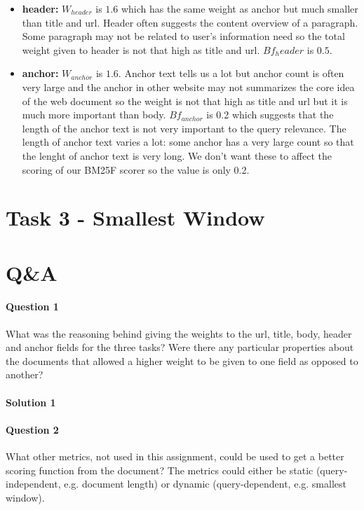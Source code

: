 \documentclass{article}
\begin{document}
\begin{itemize}
  \item \textbf{header:} $W_{header}$ is $1.6$ which has the same weight as anchor but much smaller than title and url. Header often suggests the content overview of a paragraph. Some paragraph may not be related to user's information need so the total weight given to header is not that high as title and url. $Bf_header$ is $0.5$.
  \item \textbf{anchor:} $W_{anchor}$ is $1.6$. Anchor text tells us a lot but anchor count is often very large and the anchor in other website may not summarizes the core idea of the web document so the weight is not that high as title and url but it is much more important than body. $Bf_{anchor}$ is 0.2 which suggests that the length of the anchor text is not very important to the query relevance. The length of anchor text varies a lot: some anchor has a very large count so that the lenght of anchor text is very long. We don't want these to affect the scoring of our BM25F scorer so the value is only 0.2.
\end{itemize}


\section{Task 3 - Smallest Window}

\section{Q\&A}

\paragraph{Question 1}
What was the reasoning behind giving the weights to the url, title, body, header and anchor fields for the three tasks? Were there any particular properties about the documents that allowed a higher weight to be given to one field as opposed to another?

\vspace{-3mm}
\paragraph{Solution 1}

\paragraph{Question 2}
What other metrics, not used in this assignment, could be used to get a better scoring function from the document? The metrics could either be static (query-independent, e.g. document length) or dynamic (query-dependent, e.g. smallest window).
\end{document}
